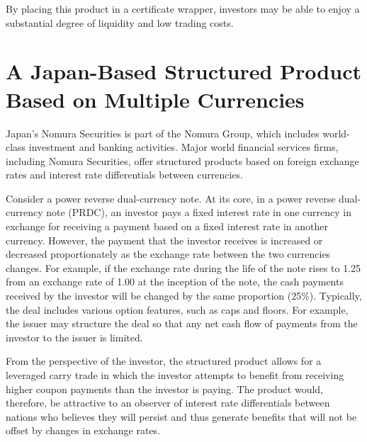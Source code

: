\documentclass[11pt]{article}
\begin{document}
By placing this product in a certificate wrapper, investors may be able to enjoy a substantial degree of liquidity and low trading costs.

\section*{A Japan-Based Structured Product Based on Multiple Currencies}
Japan's Nomura Securities is part of the Nomura Group, which includes world-class investment and banking activities. Major world financial services firms, including Nomura Securities, offer structured products based on foreign exchange rates and interest rate differentials between currencies.

Consider a power reverse dual-currency note. At its core, in a power reverse dual-currency note (PRDC), an investor pays a fixed interest rate in one currency in exchange for receiving a payment based on a fixed interest rate in another currency. However, the payment that the investor receives is increased or decreased proportionately as the exchange rate between the two currencies changes. For example, if the exchange rate during the life of the note rises to 1.25 from an exchange rate of 1.00 at the inception of the note, the cash payments received by the investor will be changed by the same proportion (25\%). Typically, the deal includes various option features, such as caps and floors. For example, the issuer may structure the deal so that any net cash flow of payments from the investor to the issuer is limited.

From the perspective of the investor, the structured product allows for a leveraged carry trade in which the investor attempts to benefit from receiving higher coupon payments than the investor is paying. The product would, therefore, be attractive to an observer of interest rate differentials between nations who believes they will persist and thus generate benefits that will not be offset by changes in exchange rates.
\end{document}
